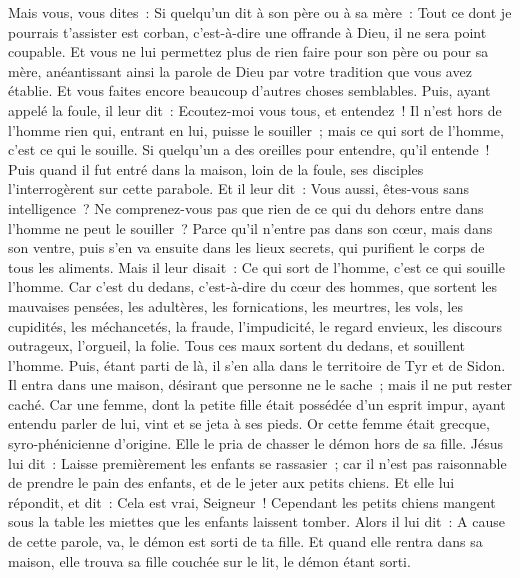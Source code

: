 \begin{multicols}{2}
Mais vous, vous dites~: Si quelqu'un dit à son père ou à sa mère~: Tout ce dont je pourrais t'assister est corban, c'est-à-dire une offrande à Dieu, il ne sera point coupable.
Et vous ne lui permettez plus de rien faire pour son père ou pour sa mère,
anéantissant ainsi la parole de Dieu par votre tradition que vous avez établie. Et vous faites encore beaucoup d'autres choses semblables.
Puis, ayant appelé la foule, il leur dit~: Ecoutez-moi vous tous, et entendez~!
Il n'est hors de l'homme rien qui, entrant en lui, puisse le souiller~; mais ce qui sort de l'homme, c'est ce qui le souille.
Si quelqu'un a des oreilles pour entendre, qu'il entende~!
Puis quand il fut entré dans la maison, loin de la foule, ses disciples l'interrogèrent sur cette parabole.
Et il leur dit~: Vous aussi, êtes-vous sans intelligence~? Ne comprenez-vous pas que rien de ce qui du dehors entre dans l'homme ne peut le souiller~?
Parce qu'il n'entre pas dans son cœur, mais dans son ventre, puis s'en va ensuite dans les lieux secrets, qui purifient le corps de tous les aliments.
Mais il leur disait~: Ce qui sort de l'homme, c'est ce qui souille l'homme.
Car c'est du dedans, c'est-à-dire du cœur des hommes, que sortent les mauvaises pensées, les adultères, les fornications, les meurtres,
les vols, les cupidités, les méchancetés, la fraude, l'impudicité, le regard envieux, les discours outrageux, l'orgueil, la folie.
Tous ces maux sortent du dedans, et souillent l'homme.
Puis, étant parti de là, il s'en alla dans le territoire de Tyr et de Sidon. Il entra dans une maison, désirant que personne ne le sache~; mais il ne put rester caché.
Car une femme, dont la petite fille était possédée d'un esprit impur, ayant entendu parler de lui, vint et se jeta à ses pieds.
Or cette femme était grecque, syro-phénicienne d'origine. Elle le pria de chasser le démon hors de sa fille. Jésus lui dit~:
Laisse premièrement les enfants se rassasier~; car il n'est pas raisonnable de prendre le pain des enfants, et de le jeter aux petits chiens.
Et elle lui répondit, et dit~: Cela est vrai, Seigneur~! Cependant les petits chiens mangent sous la table les miettes que les enfants laissent tomber.
Alors il lui dit~: A cause de cette parole, va, le démon est sorti de ta fille.
Et quand elle rentra dans sa maison, elle trouva sa fille couchée sur le lit, le démon étant sorti.

\end{multicols}
